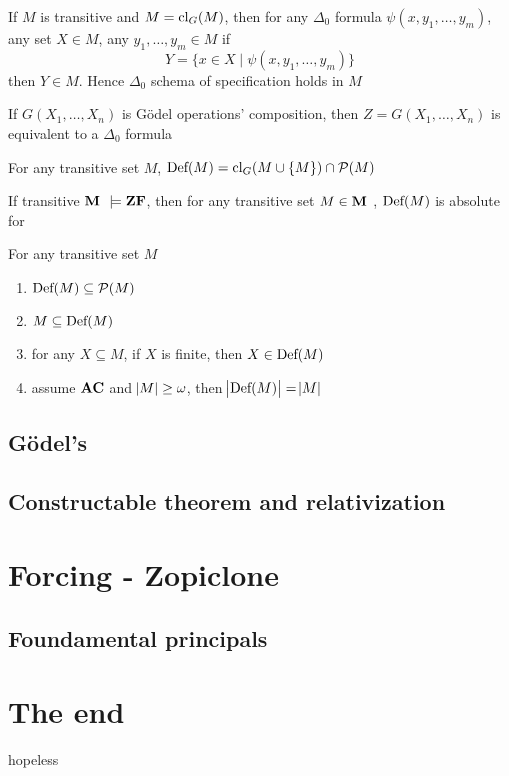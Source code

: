 \documentclass[11pt]{article}
\begin{document}
\begin{corollary}[]
If \(M\) is transitive and \(M=\text{cl}_G(M)\), then for any \(\Delta_0\) formula
\(\psi(x,y_1,\dots,y_m)\), any set \(X\in M\), any \(y_1,\dots,y_m\in M\) if
\begin{equation*}
Y=\{x\in X\mid\psi(x,y_1,\dots,y_m)\}
\end{equation*}
then \(Y\in M\). Hence \(\Delta_0\) schema of specification holds in \(M\)
\end{corollary}

\begin{lemma}[]
If \(G(X_1,\dots,X_n)\) is Gödel operations' composition, then
\(Z=G(X_1,\dots,X_n)\) is equivalent to a \(\Delta_0\) formula
\end{lemma}

\begin{theorem}[]
For any transitive set \(M\), \(\text{Def}(M)=\text{cl}_G(M\cup\{M\})\cap\mathcal{P}(M)\)
\end{theorem}

\begin{lemma}[]
If transitive \(\textbf{M }\models\textbf{ZF}\), then for any transitive set \(M\in\textbf{M }\),
\(\text{Def}(M)\) is absolute for \cm
\end{lemma}

\begin{lemma}[]
For any transitive set \(M\)
\begin{enumerate}
\item \(\text{Def}(M)\subseteq\mathcal{P}(M)\)
\item \(M\subseteq \text{Def}(M)\)
\item for any \(X\subseteq M\), if \(X\) is finite, then \(X\in\text{Def}(M)\)
\item assume \(\textbf{AC}\) and \(\abs{M}\ge\omega\), then \(\abs{\text{Def}(M)}=\abs{M}\)
\end{enumerate}
\end{lemma}
\subsection{Gödel's \cl}
\label{sec:org3156b8d}
\subsection{Constructable theorem and relativization}
\label{sec:org62e4e33}
\section{Forcing - Zopiclone}
\label{sec:org7118b78}
\subsection{Foundamental principals}
\label{sec:orgd48d710}
\subsection{}
\label{sec:org2b8e4e6}
\section{The end}
\label{sec:org93876bf}
hopeless
\end{document}
